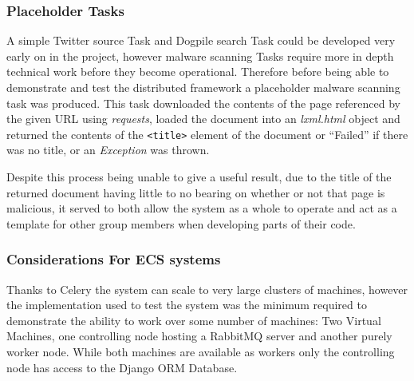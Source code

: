 \subsubsection{Placeholder Tasks}
A simple Twitter source Task and Dogpile search Task could be developed very early on in the project, however malware scanning Tasks require more in depth technical work before they become operational. Therefore 
before being able to demonstrate and test the distributed framework a placeholder malware scanning task was produced. This task downloaded the contents of the page referenced by the given URL using \emph{requests}, loaded the document into an \emph{lxml.html} object and returned the contents of the \verb`<title>` element of the document or ``Failed'' if there was no title, or an \emph{Exception} was thrown.

Despite this process being unable to give a useful result, due to the title of the returned document having little to no bearing on whether or not that page is malicious, it served to both allow the system as a whole to operate and act as a template for other group members when developing parts of their code.

\subsubsection{Considerations For ECS systems}
Thanks to Celery the system can scale to very large clusters of machines, however the implementation used to test the system was the minimum required to demonstrate the ability to work over some number of machines: Two Virtual Machines, one controlling node hosting a RabbitMQ server and another purely worker node. While both machines are available as workers only the controlling node has access to the Django ORM Database.